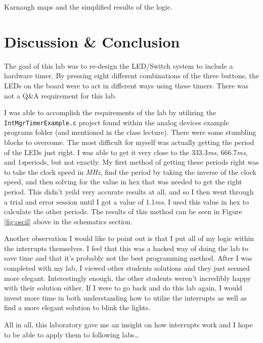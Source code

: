 \documentclass[aps,letterpaper,10pt]{revtex4}
\newcommand{\MHz}{\textsl{MHz}}
\newcommand{\ms}{\textsl{ms}}
\newcommand{\s}{\textsl{s}}
\begin{document}
	\begin{table}[H]
		\centering
		 \hspace{10mm} %
	  \caption{Karnaugh maps and the simplified results of the logic.}
	  \label{fig:kmaps}
	\end{table}


\newpage
\section{Discussion \& Conclusion}
The goal of this lab was to re-design the LED/Switch system to include a hardware timer.  By pressing eight different combinations of the three buttons, the LEDs on the board were to act in different ways using these timers. There was not a Q\&A requirement for this lab. \vspace{3mm} %

I was able to accomplish the requirements of the lab by utilizing the \texttt{IntMgrTimerExample.c} project found within the analog devices example programs folder (and mentioned in the class lecture).  There were some stumbling blocks to overcome.  The most difficult for myself was actually getting the period of the LEDs just right.  I was able to get it very close to the 333.3\ms, 666.7\ms, and 1\s periods, but not exactly.  My first method of getting these periods right was to take the clock speed in \MHz, find the period by taking the inverse of the clock speed, and then solving for the value in hex that was needed to get the right period.  This didn't yeild very accurate results at all, and so I then went through a trial and error session until I got a value of 1.1\ms.  I used this value in hex to calculate the other periods.  The results of this method can be seen in Figure \ref{fig:oscil} above in the schematics section. \vspace{3mm}

Another observation I would like to point out is that I put all of my logic within the interrupts themselves.  I feel that this was a hacked way of doing the lab to save time and that it's probably not the best programming method.  After I was completed with my lab, I viewed other students solutions and they just seemed more elegant.  Interestingly enough, the other students weren't incredibly happy with their solution either.  If I were to go back and do this lab again, I would invest more time in both understanding how to utilze the interrupts as well as find a more elegant solution to blink the lights. \vspace{3mm}

All in all, this laboratory gave me an insight on how interrupts work and I hope to be able to apply them to following labs\ldots
\end{document}
